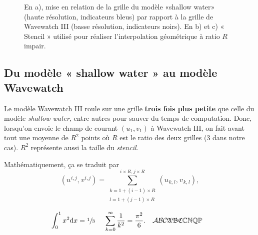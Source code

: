 \documentclass[10pt]{report}
\numberwithin{equation}{section}
\newcommand{\pt}{\hspace{1pt}} %
\begin{document}
\begin{wrapfigure}[41]{r}{0.45\textwidth}
\begin{center}
%
\end{center}
\caption{\label{org843c977}En a), mise en relation de la grille du modèle «shallow water» (haute résolution, indicateurs bleus) par rapport à la grille de Wavewatch III (basse résolution, indicateurs noirs). En b) et c) « Stencil » utilisé pour réaliser l'interpolation géométrique à ratio \(R\) impair.}
\end{wrapfigure}

\subsection{Du modèle « shallow water » au modèle Wavewatch}
\label{sec:org58a1790}

Le modèle Wavewatch III roule sur une grille \textbf{trois fois plus petite} que celle du modèle \emph{shallow water}, entre autres pour sauver du temps de computation.
Donc, lorsqu'on envoie le champ de courant \((u_1,v_1)\) à Wavewatch III, on fait avant tout une moyenne de \(R^2\) points où \(R\) est le ratio des deux grilles (3 dans notre cas).
\(R^2\) représente aussi la taille du \emph{stencil}.\bigskip

Mathématiquement, ça se traduit par
\begin{equation}
\label{eq:orgae2ab58}
   (u^{\pt i,j},\pt v^{\pt i,j}) =
   \sum_{\substack{k=1 + (i-1)\times R\\ l=1 + (j-1)\times R}}^{i\times R,\pt j\times R}
   (u_{\pt k,\pt l},\pt v_{\pt k,\pt l}),
\end{equation}

\begin{align}
   &\int_0^1 x^2 \dd x = \sfrac{1}{3} && \sum_{k=0}^\infty \frac{1}{k^2} = \frac{\pi^2}{6}. && \mathcal{ABC}\mathfrak{ABC}\mathbb{CNQP} &
\end{align}
\end{document}
